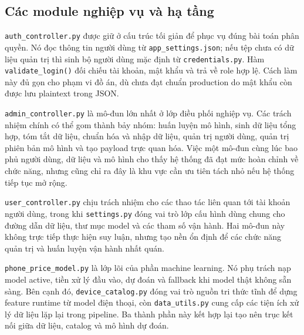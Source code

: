 \subsection{Các module nghiệp vụ và hạ tầng}


\texttt{auth\_controller.py} được giữ ở cấu trúc tối giản để phục vụ đúng bài toán phân quyền. Nó đọc thông tin người dùng từ \texttt{app\_settings.json}; nếu tệp chưa có dữ liệu quản trị thì sinh bộ người dùng mặc định từ \texttt{credentials.py}. Hàm \texttt{validate\_login()} đối chiếu tài khoản, mật khẩu và trả về role hợp lệ. Cách làm này đủ gọn cho phạm vi đồ án, dù chưa đạt chuẩn production do mật khẩu còn được lưu plaintext trong JSON.


\texttt{admin\_controller.py} là mô-đun lớn nhất ở lớp điều phối nghiệp vụ. Các trách nhiệm chính có thể gom thành bảy nhóm: huấn luyện mô hình, sinh dữ liệu tổng hợp, tóm tắt dữ liệu, chuẩn hóa và nhập dữ liệu, quản trị người dùng, quản trị phiên bản mô hình và tạo payload trực quan hóa. Việc một mô-đun cùng lúc bao phủ người dùng, dữ liệu và mô hình cho thấy hệ thống đã đạt mức hoàn chỉnh về chức năng, nhưng cũng chỉ ra đây là khu vực cần ưu tiên tách nhỏ nếu hệ thống tiếp tục mở rộng.


\texttt{user\_controller.py} chịu trách nhiệm cho các thao tác liên quan tới tài khoản người dùng, trong khi \texttt{settings.py} đóng vai trò lớp cấu hình dùng chung cho đường dẫn dữ liệu, thư mục model và các tham số vận hành. Hai mô-đun này không trực tiếp thực hiện suy luận, nhưng tạo nền ổn định để các chức năng quản trị và huấn luyện vận hành nhất quán.


\texttt{phone\_price\_model.py} là lớp lõi của phần machine learning. Nó phụ trách nạp model active, tiền xử lý đầu vào, dự đoán và fallback khi model thật không sẵn sàng. Bên cạnh đó, \texttt{device\_catalog.py} đóng vai trò nguồn tri thức tĩnh để dựng feature runtime từ model điện thoại, còn \texttt{data\_utils.py} cung cấp các tiện ích xử lý dữ liệu lặp lại trong pipeline. Ba thành phần này kết hợp lại tạo nên trục kết nối giữa dữ liệu, catalog và mô hình dự đoán.
